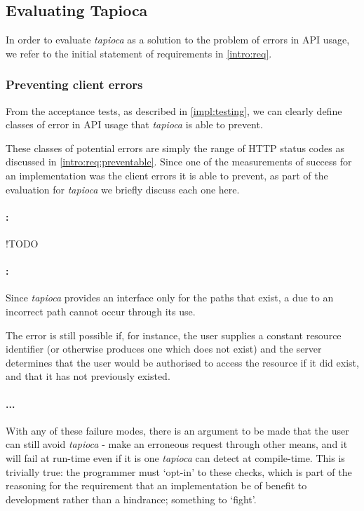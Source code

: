 \subsection{Evaluating Tapioca} \label{concl:eval}

In order to evaluate \emph{tapioca} as a solution to the problem of errors in API usage, we refer to the initial statement of requirements in \ref{intro:req}.

\subsubsection{Preventing client errors} \label{concl:eval:prevent}

From the acceptance tests, as described in \cref{impl:testing}, we can clearly define classes of error in API usage that \emph{tapioca} is able to prevent.

These classes of potential errors are simply the  range of HTTP status codes as discussed in \cref{intro:req:preventable}. Since one of the measurements of success for an implementation was the client errors it is able to prevent, as part of the evaluation for \emph{tapioca} we briefly discuss each one here. 

\paragraph{:} !TODO

\paragraph{:} Since \emph{tapioca} provides an interface only for the paths that exist, a  due to an incorrect path cannot occur through its use.

The error is still possible if, for instance, the user supplies a constant resource identifier (or otherwise produces one which does not exist) and the server determines that the user would be authorised to access the resource if it did exist, and that it has not previously existed.

\paragraph{... \\}

With any of these failure modes, there is an argument to be made that the user can still avoid \emph{tapioca} - make an erroneous request through other means, and it will fail at run-time even if it is one \emph{tapioca} can detect at compile-time. This is trivially true: the programmer must `opt-in' to these checks, which is part of the reasoning for the requirement that an implementation be of benefit to development rather than a hindrance; something to `fight'.

